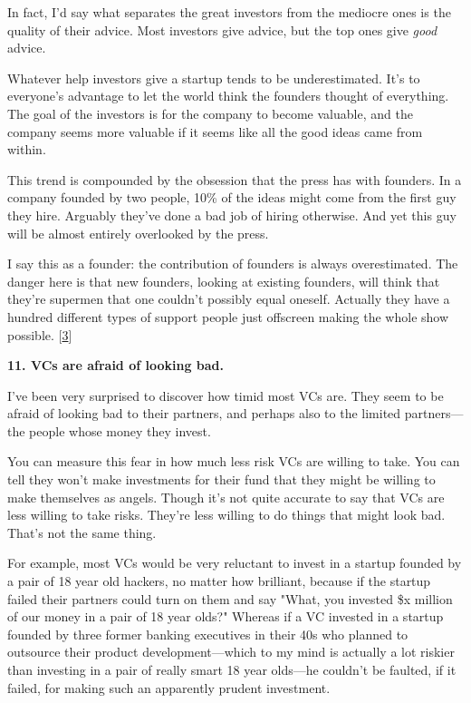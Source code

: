 In
                  fact, I'd say what separates the great investors from the
                  mediocre ones is the quality of their advice. Most investors
                  give advice, but the top ones give
                  \emph{good} advice.

Whatever help investors give a
                  startup tends to be underestimated. It's to everyone's
                  advantage to let the world think the founders thought of
                  everything. The goal of the investors is for the company to
                  become valuable, and the company seems more valuable if it
                  seems like all the good ideas came from within.

This
                  trend is compounded by the obsession that the press has with
                  founders. In a company founded by two people, 10\% of the ideas
                  might come from the first guy they hire. Arguably they've done
                  a bad job of hiring otherwise. And yet this guy will be almost
                  entirely overlooked by the press.

I say this as a
                  founder: the contribution of founders is always overestimated.
                  The danger here is that new founders, looking at existing
                  founders, will think that they're supermen that one couldn't
                  possibly equal oneself. Actually they have a hundred different
                  types of support people just offscreen making the whole show
                  possible.
                  [\href{\#f3n}{3}]

\textbf{11. VCs are afraid of looking bad.}

I've been very surprised to discover how timid
                  most VCs are. They seem to be afraid of looking bad to their
                  partners, and perhaps also to the limited partners---the
                  people whose money they invest.

You can measure
                  this fear in how much less risk VCs are willing to take. You
                  can tell they won't make investments for their fund that they
                  might be willing to make themselves as angels. Though it's not
                  quite accurate to say that VCs are less willing to take risks.
                  They're less willing to do things that might look bad. That's
                  not the same thing.

For example, most VCs would be
                  very reluctant to invest in a startup founded by a pair of 18
                  year old hackers, no matter how brilliant, because if the
                  startup failed their partners could turn on them and say
                  "What, you invested \$x million of our money in a pair of 18
                  year olds?" Whereas if a VC invested in a startup founded by
                  three former banking executives in their 40s who planned to
                  outsource their product development---which to my mind is
                  actually a lot riskier than investing in a pair of really
                  smart 18 year olds---he couldn't be faulted, if it failed,
                  for making such an apparently prudent investment.


